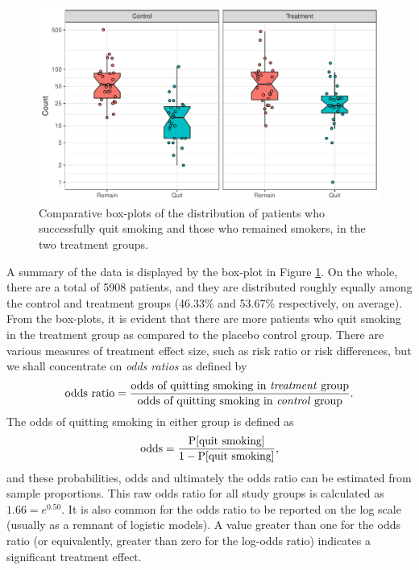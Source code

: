 \documentclass[a4paper,showframe,11pt]{report}\usepackage[]{graphicx}\usepackage[]{color}
\makeatletter
\def\maxwidth{ %
  \ifdim\Gin@nat@width>\linewidth
    \linewidth
  \else
    \Gin@nat@width
  \fi
}
\newenvironment{kframe}{%
 \def\at@end@of@kframe{}%
 \ifinner\ifhmode%
  \def\at@end@of@kframe{\end{minipage}}%
  \begin{minipage}{\columnwidth}%
 \fi\fi%
 \def\FrameCommand##1{\hskip\@totalleftmargin \hskip-\fboxsep
 \colorbox{shadecolor}{##1}\hskip-\fboxsep
     \hskip-\linewidth \hskip-\@totalleftmargin \hskip\columnwidth}%
 \MakeFramed {\advance\hsize-\width
   \@totalleftmargin\z@ \linewidth\hsize
   \@setminipage}}%
 {\par\unskip\endMakeFramed%
 \at@end@of@kframe}
\newenvironment{knitrout}{}{} %
\makeatother
\begin{document}
\begin{knitrout}
\color{fgcolor}\begin{kframe}
\singlespacing\end{kframe}\begin{figure}

{\centering \includegraphics[width=\maxwidth]{figure/05-plot_data_smoke-1} 

}

\caption[Comparative box-plots of the distribution of patients who successfully quit smoking and those who remained smokers, in the two treatment groups]{Comparative box-plots of the distribution of patients who successfully quit smoking and those who remained smokers, in the two treatment groups.}\label{fig:plot.data.smoke}
\end{figure}


\end{knitrout}

A summary of the data is displayed by the box-plot in Figure \ref{fig:plot.data.smoke}.
On the whole, there are a total of 5908 patients, and they are distributed roughly equally among the control and treatment groups (46.33\% and 53.67\% respectively, on average).
From the box-plots, it is evident that there are more patients who quit smoking in the treatment group as compared to the placebo control group.
There are various measures of treatment effect size, such as risk ratio or risk differences, but we shall concentrate on \emph{odds ratios} as defined by
\[
  \text{odds ratio} = \frac{\text{odds of quitting smoking in \emph{treatment} group}}
  {\text{odds of quitting smoking in \emph{control} group}}.
\]
The odds of quitting smoking in either group is defined as
\[
  \text{odds} = \frac{\operatorname{P}[\text{quit smoking}]}{1 - \operatorname{P}[\text{quit smoking}]},
\]
and these probabilities, odds and ultimately the odds ratio can be estimated from sample proportions.
This raw odds ratio for all study groups is calculated as $1.66 = e^{0.50}$.
It is also common for the odds ratio to be reported on the log scale (usually as a remnant of logistic models).
A value greater than one for the odds ratio (or equivalently, greater than zero for the log-odds ratio) indicates a significant treatment effect.
\end{document}
